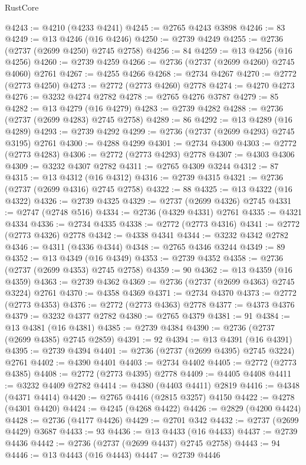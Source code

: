 \begin{lexlean}{RustCore}
\begin{coremodule}
@4243 := @4210 (@4233 @4241)
@4245 := @2765 @4243 @3898
@4246 := 83
@4249 := @13 @4246 (@16 @4246)
@4250 := @2739 @4249
@4255 := @2736 (@2737 (@2699 @4250) @2745 @2758)
@4256 := 84
@4259 := @13 @4256 (@16 @4256)
@4260 := @2739 @4259
@4266 := @2736 (@2737 (@2699 @4260) @2745 @4060) @2761
@4267 := @4255 @4266
@4268 := @2734 @4267
@4270 := @2772 (@2773 @4250)
@4273 := @2772 (@2773 @4260) @2778
@4274 := @4270 @4273
@4276 := @3232 @4274 @2782
@4278 := @2765 @4276 @3787
@4279 := 85
@4282 := @13 @4279 (@16 @4279)
@4283 := @2739 @4282
@4288 := @2736 (@2737 (@2699 @4283) @2745 @2758)
@4289 := 86
@4292 := @13 @4289 (@16 @4289)
@4293 := @2739 @4292
@4299 := @2736 (@2737 (@2699 @4293) @2745 @3195) @2761
@4300 := @4288 @4299
@4301 := @2734 @4300
@4303 := @2772 (@2773 @4283)
@4306 := @2772 (@2773 @4293) @2778
@4307 := @4303 @4306
@4309 := @3232 @4307 @2782
@4311 := @2765 @4309 @3244
@4312 := 87
@4315 := @13 @4312 (@16 @4312)
@4316 := @2739 @4315
@4321 := @2736 (@2737 (@2699 @4316) @2745 @2758)
@4322 := 88
@4325 := @13 @4322 (@16 @4322)
@4326 := @2739 @4325
@4329 := @2737 (@2699 @4326) @2745
@4331 := @2747 (@2748 @516)
@4334 := @2736 (@4329 @4331) @2761
@4335 := @4321 @4334
@4336 := @2734 @4335
@4338 := @2772 (@2773 @4316)
@4341 := @2772 (@2773 @4326) @2778
@4342 := @4338 @4341
@4344 := @3232 @4342 @2782
@4346 := @4311 (@4336 @4344)
@4348 := @2765 @4346 @3244
@4349 := 89
@4352 := @13 @4349 (@16 @4349)
@4353 := @2739 @4352
@4358 := @2736 (@2737 (@2699 @4353) @2745 @2758)
@4359 := 90
@4362 := @13 @4359 (@16 @4359)
@4363 := @2739 @4362
@4369 := @2736 (@2737 (@2699 @4363) @2745 @3224) @2761
@4370 := @4358 @4369
@4371 := @2734 @4370
@4373 := @2772 (@2773 @4353)
@4376 := @2772 (@2773 @4363) @2778
@4377 := @4373 @4376
@4379 := @3232 @4377 @2782
@4380 := @2765 @4379
@4381 := 91
@4384 := @13 @4381 (@16 @4381)
@4385 := @2739 @4384
@4390 := @2736 (@2737 (@2699 @4385) @2745 @2859)
@4391 := 92
@4394 := @13 @4391 (@16 @4391)
@4395 := @2739 @4394
@4401 := @2736 (@2737 (@2699 @4395) @2745 @3224) @2761
@4402 := @4390 @4401
@4403 := @2734 @4402
@4405 := @2772 (@2773 @4385)
@4408 := @2772 (@2773 @4395) @2778
@4409 := @4405 @4408
@4411 := @3232 @4409 @2782
@4414 := @4380 (@4403 @4411) @2819
@4416 := @4348 (@4371 @4414)
@4420 := @2765 @4416 (@2815 @3257) @4150
@4422 := @4278 (@4301 @4420)
@4424 := @4245 (@4268 @4422)
@4426 := @2829 (@4200 @4424)
@4428 := @2736 (@4177 @4426)
@4429 := @2701 @342
@4432 := @2737 (@2699 @4429) @3687
@4433 := 93
@4436 := @13 @4433 (@16 @4433)
@4437 := @2739 @4436
@4442 := @2736 (@2737 (@2699 @4437) @2745 @2758)
@4443 := 94
@4446 := @13 @4443 (@16 @4443)
@4447 := @2739 @4446

\end{coremodule}
\end{lexlean}

